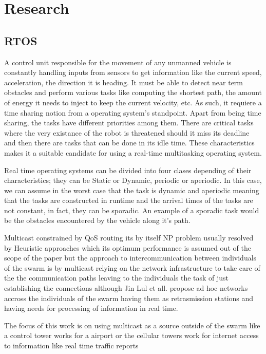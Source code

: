 \documentclass[journal]{IEEEtran}
\begin{document}
\section{Research}
\subsection{RTOS}
A control unit responsible for the movement of any unmanned vehicle is constantly handling inputs from sensors to get information like the current speed, acceleration, the direction it is heading. It must be able to detect near term obstacles and perform various tasks like computing the shortest path, the amount of energy it needs to inject to keep the current velocity, etc. As such, it requiere a time sharing notion from a operating system's standpoint. Apart from being time sharing, the tasks have different priorities among them. There are critical tasks where the very existance of the robot is threatened should it miss its deadline and then there are tasks that can be done in its idle time. These characteristics makes it a suitable candidate for using a real-time multitasking operating system.

Real time operating systems can be divided into four clases depending of their characteristics; they can be Static or Dynamic, periodic or aperiodic. In this case, we can assume in the worst case that the task is dynamic and aperiodic meaning that the tasks are constructed in runtime and the arrival times of the tasks are not constant, in fact, they can be sporadic. An example of a sporadic task would be the obstacles encountered by the vehicle along it's path.

Multicast constrained by QoS routing its by itself NP problem usually resolved by Heuristic approaches \cite{HH1} which its optimum performance is assumed out of the scope of the paper but the approach to  intercommunication between individuals of the swarm is by multicast relying on the network infrastructure to take care of the the communication paths leaving to the individuals the task of just establishing the connections although Jin Lul et all. \cite{HH2} propose ad hoc networks accross the individuals of the swarm having them as retrasmission stations and having needs for processing of information in real time.


The focus of this work is on using multicast as a source outside of the swarm like a control tower works for a airport or the cellular towers work for internet access to information like real time traffic reports\cite{YS1}
\end{document}
